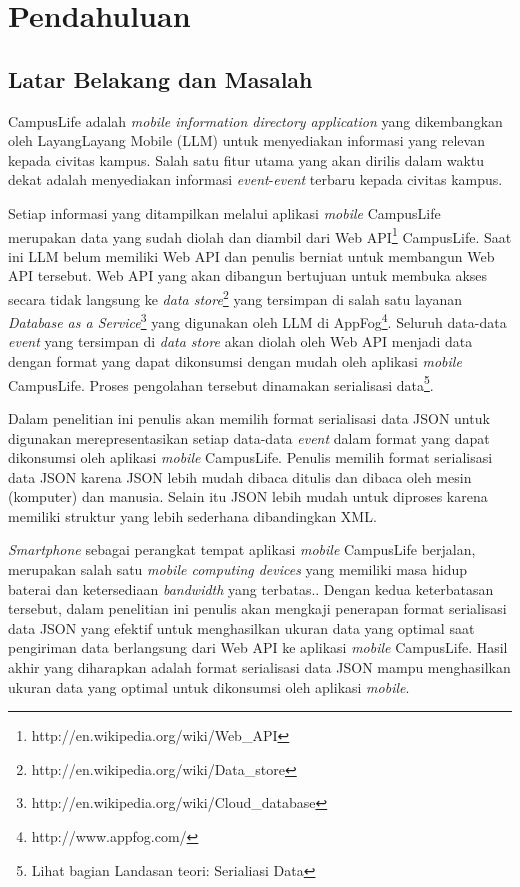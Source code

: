 \documentclass[a4paper, 12pt]{report}
\begin{document}
\chapter{Pendahuluan}
\section{Latar Belakang dan Masalah}
\onehalfspacing CampusLife adalah \textit{mobile information directory application} yang dikembangkan oleh LayangLayang Mobile (LLM) untuk menyediakan informasi yang relevan kepada civitas kampus. Salah satu fitur utama yang akan dirilis dalam waktu dekat adalah menyediakan informasi \textit{event}-\textit{event} terbaru kepada civitas kampus. 

\onehalfspacing Setiap informasi yang ditampilkan melalui aplikasi \textit{mobile} CampusLife merupakan data yang sudah diolah dan diambil dari Web API\footnote{http://en.wikipedia.org/wiki/Web\_API} CampusLife. Saat ini LLM belum memiliki Web API dan penulis berniat untuk membangun Web API tersebut. Web API yang akan dibangun bertujuan untuk membuka akses secara tidak langsung ke \textit{data store}\footnote{http://en.wikipedia.org/wiki/Data\_store} yang tersimpan di salah satu layanan \textit{Database as a Service}\footnote{http://en.wikipedia.org/wiki/Cloud\_database} yang digunakan oleh LLM di AppFog\footnote{http://www.appfog.com/}. Seluruh data-data \textit{event} yang tersimpan di \textit{data store} akan diolah oleh Web API menjadi data dengan format yang dapat dikonsumsi dengan mudah oleh aplikasi \textit{mobile} CampusLife. Proses pengolahan tersebut dinamakan serialisasi data\footnote{Lihat bagian Landasan teori: Serialiasi Data}.

\onehalfspacing Dalam penelitian ini penulis akan memilih format serialisasi data JSON untuk digunakan merepresentasikan setiap data-data \textit{event} dalam format yang dapat dikonsumsi oleh aplikasi \textit{mobile} CampusLife. Penulis memilih format serialisasi data JSON karena JSON lebih mudah dibaca ditulis dan dibaca oleh mesin (komputer) dan manusia. Selain itu JSON lebih mudah untuk diproses karena memiliki struktur yang lebih sederhana dibandingkan XML\cite{json-fat-free}\cite{json-vs-xml-debate}.

\onehalfspacing \textit{Smartphone} sebagai perangkat tempat aplikasi \textit{mobile} CampusLife berjalan, merupakan salah satu \textit{mobile computing devices} yang memiliki masa hidup baterai dan ketersediaan \textit{bandwidth} yang terbatas.\cite{challenging-issues-and-limitations-of-mobile-computing}. Dengan kedua keterbatasan tersebut, dalam penelitian ini penulis akan mengkaji penerapan format serialisasi data JSON yang efektif untuk menghasilkan ukuran data yang optimal saat pengiriman data berlangsung dari Web API ke aplikasi \textit{mobile} CampusLife. Hasil akhir yang diharapkan adalah format serialisasi data JSON mampu menghasilkan ukuran data yang optimal untuk dikonsumsi oleh aplikasi \textit{mobile}.
\end{document}
